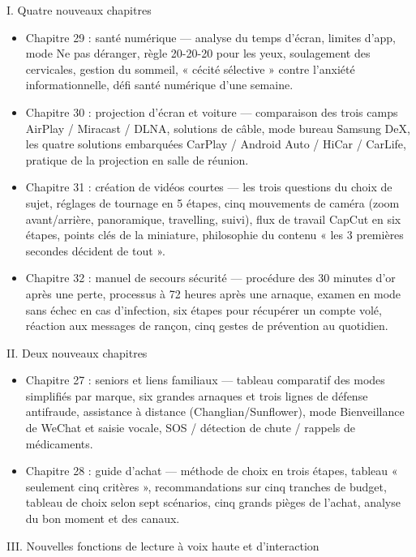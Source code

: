 
I. Quatre nouveaux chapitres

\begin{itemize}
  \item Chapitre 29 : santé numérique — analyse du temps d'écran, limites d'app, mode Ne pas déranger, règle 20-20-20 pour les yeux, soulagement des cervicales, gestion du sommeil, « cécité sélective » contre l'anxiété informationnelle, défi santé numérique d'une semaine.
  \item Chapitre 30 : projection d'écran et voiture — comparaison des trois camps AirPlay / Miracast / DLNA, solutions de câble, mode bureau Samsung DeX, les quatre solutions embarquées CarPlay / Android Auto / HiCar / CarLife, pratique de la projection en salle de réunion.
  \item Chapitre 31 : création de vidéos courtes — les trois questions du choix de sujet, réglages de tournage en 5 étapes, cinq mouvements de caméra (zoom avant/arrière, panoramique, travelling, suivi), flux de travail CapCut en six étapes, points clés de la miniature, philosophie du contenu « les 3 premières secondes décident de tout ».
  \item Chapitre 32 : manuel de secours sécurité — procédure des 30 minutes d'or après une perte, processus à 72 heures après une arnaque, examen en mode sans échec en cas d'infection, six étapes pour récupérer un compte volé, réaction aux messages de rançon, cinq gestes de prévention au quotidien.
\end{itemize}

II. Deux nouveaux chapitres

\begin{itemize}
  \item Chapitre 27 : seniors et liens familiaux — tableau comparatif des modes simplifiés par marque, six grandes arnaques et trois lignes de défense antifraude, assistance à distance (Changlian/Sunflower), mode Bienveillance de WeChat et saisie vocale, SOS / détection de chute / rappels de médicaments.
  \item Chapitre 28 : guide d'achat — méthode de choix en trois étapes, tableau « seulement cinq critères », recommandations sur cinq tranches de budget, tableau de choix selon sept scénarios, cinq grands pièges de l'achat, analyse du bon moment et des canaux.
\end{itemize}

III. Nouvelles fonctions de lecture à voix haute et d'interaction

